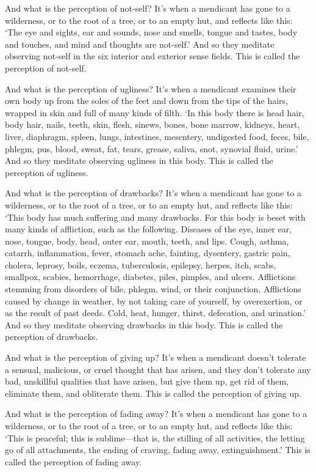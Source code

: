 \documentclass[12pt,openany]{book}%
\begin{document}
And what is the perception of not-self? It’s when a mendicant has gone to a wilderness, or to the root of a tree, or to an empty hut, and reflects like this: ‘The eye and sights, ear and sounds, nose and smells, tongue and tastes, body and touches, and mind and thoughts are not-self.’ And so they meditate observing not-self in the six interior and exterior sense fields. This is called the perception of not-self. 

And what is the perception of ugliness? It’s when a mendicant examines their own body up from the soles of the feet and down from the tips of the hairs, wrapped in skin and full of many kinds of filth. ‘In this body there is head hair, body hair, nails, teeth, skin, flesh, sinews, bones, bone marrow, kidneys, heart, liver, diaphragm, spleen, lungs, intestines, mesentery, undigested food, feces, bile, phlegm, pus, blood, sweat, fat, tears, grease, saliva, snot, synovial fluid, urine.’ And so they meditate observing ugliness in this body. This is called the perception of ugliness. 

And what is the perception of drawbacks? It’s when a mendicant has gone to a wilderness, or to the root of a tree, or to an empty hut, and reflects like this: ‘This body has much suffering and many drawbacks. For this body is beset with many kinds of affliction, such as the following. Diseases of the eye, inner ear, nose, tongue, body, head, outer ear, mouth, teeth, and lips. Cough, asthma, catarrh, inflammation, fever, stomach ache, fainting, dysentery, gastric pain, cholera, leprosy, boils, eczema, tuberculosis, epilepsy, herpes, itch, scabs, smallpox, scabies, hemorrhage, diabetes, piles, pimples, and ulcers. Afflictions stemming from disorders of bile, phlegm, wind, or their conjunction. Afflictions caused by change in weather, by not taking care of yourself, by overexertion, or as the result of past deeds. Cold, heat, hunger, thirst, defecation, and urination.’ And so they meditate observing drawbacks in this body. This is called the perception of drawbacks. 

And what is the perception of giving up? It’s when a mendicant doesn’t tolerate a sensual, malicious, or cruel thought that has arisen, and they don’t tolerate any bad, unskillful qualities that have arisen, but give them up, get rid of them, eliminate them, and obliterate them. This is called the perception of giving up. 

And what is the perception of fading away? It’s when a mendicant has gone to a wilderness, or to the root of a tree, or to an empty hut, and reflects like this: ‘This is peaceful; this is sublime—that is, the stilling of all activities, the letting go of all attachments, the ending of craving, fading away, extinguishment.’ This is called the perception of fading away. 
\end{document}
